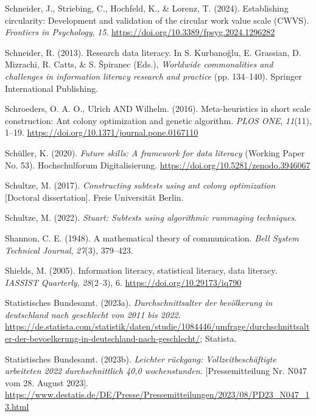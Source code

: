 \documentclass[
  12pt,
  a4paper,
  twoside]{article}
\newlength{\cslhangindent}
\newenvironment{CSLReferences}[2] %
 {\begin{list}{}{%
  \setlength{\itemindent}{0pt}
  \setlength{\leftmargin}{0pt}
  \setlength{\parsep}{0pt}
  \ifodd #1
   \setlength{\leftmargin}{\cslhangindent}
   \setlength{\itemindent}{-1\cslhangindent}
  \fi
  \setlength{\itemsep}{#2\baselineskip}}}
 {\end{list}}
\begin{document}
\begin{CSLReferences}{1}{0}
Schneider, J., Striebing, C., Hochfeld, K., \& Lorenz, T. (2024). Establishing circularity: Development and validation of the circular work value scale (CWVS). \emph{Frontiers in Psychology}, \emph{15}. \url{https://doi.org/10.3389/fpsyg.2024.1296282}

Schneider, R. (2013). Research data literacy. In S. Kurbanoğlu, E. Grassian, D. Mizrachi, R. Catts, \& S. Špiranec (Eds.), \emph{Worldwide commonalities and challenges in information literacy research and practice} (pp. 134--140). Springer International Publishing.

Schroeders, O. A. O., Ulrich AND Wilhelm. (2016). Meta-heuristics in short scale construction: Ant colony optimization and genetic algorithm. \emph{PLOS ONE}, \emph{11}(11), 1--19. \url{https://doi.org/10.1371/journal.pone.0167110}

Schüller, K. (2020). \emph{Future skills: A framework for data literacy} (Working Paper No. 53). Hochschulforum Digitalisierung. \url{https://doi.org/10.5281/zenodo.3946067}

Schultze, M. (2017). \emph{Constructing subtests using ant colony optimization} {[}Doctoral dissertation{]}. Freie Universität Berlin.

Schultze, M. (2022). \emph{Stuart: Subtests using algorithmic rummaging techniques}.

Shannon, C. E. (1948). A mathematical theory of communication. \emph{Bell System Technical Journal}, \emph{27}(3), 379--423.

Shields, M. (2005). Information literacy, statistical literacy, data literacy. \emph{IASSIST Quarterly}, \emph{28}(2--3), 6. \url{https://doi.org/10.29173/iq790}

Statistisches Bundesamt. (2023a). \emph{Durchschnittsalter der bevölkerung in deutschland nach geschlecht von 2011 bis 2022}. \url{https://de.statista.com/statistik/daten/studie/1084446/umfrage/durchschnittsalter-der-bevoelkerung-in-deutschland-nach-geschlecht/}; Statista.

Statistisches Bundesamt. (2023b). \emph{Leichter rückgang: Vollzeitbeschäftigte arbeiteten 2022 durchschnittlich 40,0 wochenstunden.} {[}Pressemitteilung Nr. N047 vom 28. August 2023{]}. \url{https://www.destatis.de/DE/Presse/Pressemitteilungen/2023/08/PD23_N047_13.html}


\end{CSLReferences}
\end{document}
